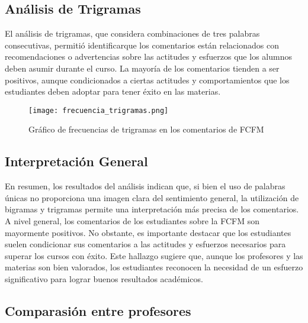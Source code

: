 \documentclass[a4paper,12pt]{article}
\begin{document}
\subsection{Análisis de Trigramas}

El análisis de trigramas, que considera combinaciones de tres palabras consecutivas, permitió identificarque los comentarios están relacionados con recomendaciones o advertencias sobre las actitudes y esfuerzos que los alumnos deben asumir durante el curso. La mayoría de los comentarios tienden a ser positivos, aunque condicionados a ciertas actitudes y comportamientos que los estudiantes deben adoptar para tener éxito en las materias.

\begin{figure}[h!]
    \centering
    \texttt{[image: frecuencia\_trigramas.png]}
    \caption{Gráfico de frecuencias de trigramas en los comentarios de FCFM}
    \label{fig:frecuencia_trigramas}
\end{figure}

\subsection{Interpretación General}

En resumen, los resultados del análisis indican que, si bien el uso de palabras únicas no proporciona una imagen clara del sentimiento general, la utilización de bigramas y trigramas permite una interpretación más precisa de los comentarios. A nivel general, los comentarios de los estudiantes sobre la FCFM son mayormente positivos. No obstante, es importante destacar que los estudiantes suelen condicionar sus comentarios a las actitudes y esfuerzos necesarios para superar los cursos con éxito. Este hallazgo sugiere que, aunque los profesores y las materias son bien valorados, los estudiantes reconocen la necesidad de un esfuerzo significativo para lograr buenos resultados académicos.

\subsection{Comparasión entre profesores}
\end{document}
